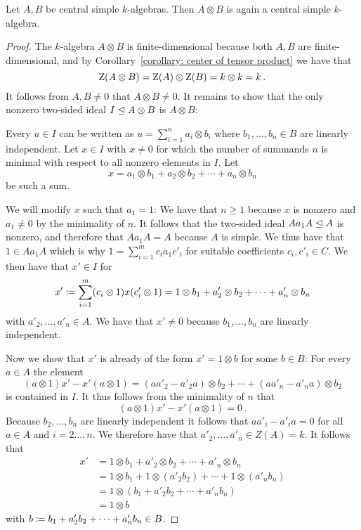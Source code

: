 \begin{proposition}
  Let $A, B$ be central simple $k$-algebras.
  Then $A \otimes B$ is again a central simple $k$-algebra.
\end{proposition}


\begin{proof}
  The $k$-algebra $A \otimes B$ is finite-dimensional because both $A, B$ are finite-di\-men\-si\-o\-nal, and by Corollary~\ref{corollary: center of tensor product} we have that
  \[
      \operatorname{Z}(A \otimes B)
    = \operatorname{Z}(A) \otimes \operatorname{Z}(B)
    = k \otimes k
    = k \,.
  \]
  It follows from $A, B \neq 0$ that $A \otimes B \neq 0$.
  It remains to show that the only nonzero two-sided ideal $I \trianglelefteq A \otimes B$ is $A \otimes B$:
  
  Every $u \in I$ can be written as $u = \sum_{i=1}^n a_i \otimes b_i$ where $b_1, \dotsc, b_n \in B$ are linearly independent.
  Let $x \in I$ with $x \neq 0$ for which the number of summands $n$ is minimal with respect to all nonzero elements in $I$.
  Let
  \begin{equation}
    \label{eqn: u as a sum}
      x
    = a_1 \otimes b_1 + a_2 \otimes b_2 + \dotsb + a_n \otimes b_n
  \end{equation}
  be such a sum.
  
  We will modify $x$ such that $a_1 = 1$:
  We have that $n \geq 1$ because $x$ is nonzero and $a_1 \neq 0$ by the minimality of $n$.
  It follows that the two-sided ideal $A a_1 A \trianglelefteq A$ is nonzero, and therefore that $A a_1 A = A$ because $A$ is simple.
  We thus have that $1 \in A a_1 A$ which is why $1 = \sum_{i=1}^m c_i a_1 c'_i$ for suitable coefficients $c_i, c'_i \in C$.
  We then have that $x' \in I$ for
  \[
              x'
    \coloneqq  \sum_{i=1}^m (c_i \otimes 1) x (c'_i \otimes 1)
    =         1 \otimes b_1 + a'_2 \otimes b_2 + \dotsb + a'_n \otimes b_n
  \]
  with $a'_2, \dotsc, a'_n \in A$.
  We have that $x' \neq 0$ because $b_1, \dotsc, b_n$ are linearly independent.
  
  Now we show that $x'$ is already of the form $x' = 1 \otimes b$ for some $b \in B$:
  For every $a \in A$ the element
  \[
        (a \otimes 1) x' - x' (a \otimes 1)
    =     (a a'_2 - a'_2 a) \otimes b_2
        + \dotsb
        + (a a'_n - a'_n a) \otimes b_2
  \]
  is contained in $I$.
  It thus follows from the minimality of $n$ that
  \[
      (a \otimes 1) x' - x' (a \otimes 1)
    = 0 \,.
  \]
  Because $b_2, \dotsc, b_n$ are linearly independent it follows that $a a'_i - a'_i a = 0$ for all $a \in A$ and $i = 2 \dotsc, n$.
  We therefore have that $a'_2, \dotsc, a'_n \in Z(A) = k$.
  It follows that
  \begin{align*}
        x'
    &=  1 \otimes b_1 + a'_2 \otimes b_2 + \dotsb + a'_n \otimes b_n  \\
    &=  1 \otimes b_1 + 1 \otimes (a'_2 b_2) + \dotsb + 1 \otimes (a'_n b_n)  \\
    &=  1 \otimes (b_1 + a'_2 b_2 + \dotsb + a'_n b_n)  \\
    &=  1 \otimes b
  \end{align*}
  with $b \coloneqq b_1 + a'_2 b_2 + \dotsb + a'_n b_n \in B$.
  

\end{proof}
